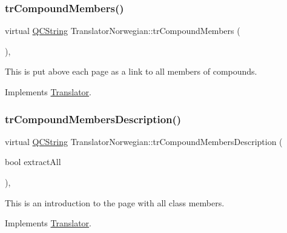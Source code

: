 \mbox{\label{class_translator_norwegian_a5fecba8518aa19f0ff8d78a3e7f6acc8}} 
\subsubsection{\texorpdfstring{trCompoundMembers()}{trCompoundMembers()}}
{\footnotesize\ttfamily virtual \mbox{\hyperlink{class_q_c_string}{Q\+C\+String}} Translator\+Norwegian\+::tr\+Compound\+Members (\begin{DoxyParamCaption}{ }\end{DoxyParamCaption})\hspace{0.3cm}{\ttfamily [inline]}, {\ttfamily [virtual]}}

This is put above each page as a link to all members of compounds. 

Implements \mbox{\hyperlink{class_translator}{Translator}}.

\mbox{\label{class_translator_norwegian_a409423af24454ffed30d2aeab812a9b3}} 
\subsubsection{\texorpdfstring{trCompoundMembersDescription()}{trCompoundMembersDescription()}}
{\footnotesize\ttfamily virtual \mbox{\hyperlink{class_q_c_string}{Q\+C\+String}} Translator\+Norwegian\+::tr\+Compound\+Members\+Description (\begin{DoxyParamCaption}\item[{bool}]{extract\+All }\end{DoxyParamCaption})\hspace{0.3cm}{\ttfamily [inline]}, {\ttfamily [virtual]}}

This is an introduction to the page with all class members. 

Implements \mbox{\hyperlink{class_translator}{Translator}}.

\mbox{\label{class_translator_norwegian_ac12c2d71889035d00a6f77d306139b5c}} 
